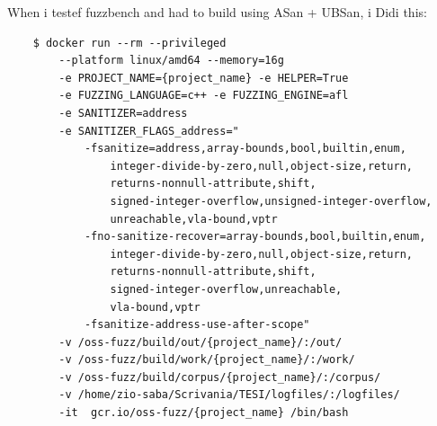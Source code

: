 When i testef fuzzbench and had to build using ASan + UBSan, i Didi this:
\begin{verbatim}
    $ docker run --rm --privileged 
        --platform linux/amd64 --memory=16g 
        -e PROJECT_NAME={project_name} -e HELPER=True 
        -e FUZZING_LANGUAGE=c++ -e FUZZING_ENGINE=afl 
        -e SANITIZER=address 
        -e SANITIZER_FLAGS_address="
            -fsanitize=address,array-bounds,bool,builtin,enum,
                integer-divide-by-zero,null,object-size,return,
                returns-nonnull-attribute,shift,
                signed-integer-overflow,unsigned-integer-overflow,
                unreachable,vla-bound,vptr
            -fno-sanitize-recover=array-bounds,bool,builtin,enum,
                integer-divide-by-zero,null,object-size,return,
                returns-nonnull-attribute,shift,
                signed-integer-overflow,unreachable,
                vla-bound,vptr 
            -fsanitize-address-use-after-scope" 
        -v /oss-fuzz/build/out/{project_name}/:/out/  
        -v /oss-fuzz/build/work/{project_name}/:/work/
        -v /oss-fuzz/build/corpus/{project_name}/:/corpus/
        -v /home/zio-saba/Scrivania/TESI/logfiles/:/logfiles/  
        -it  gcr.io/oss-fuzz/{project_name} /bin/bash
\end{verbatim}

